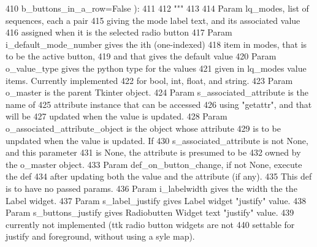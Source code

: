 \begin{DoxyCode}
410             b\_buttons\_in\_a\_row=\textcolor{keyword}{False} ):
411 
412         \textcolor{stringliteral}{"""}
413 \textcolor{stringliteral}{        }
414 \textcolor{stringliteral}{        Param lq\_modes, list of sequences, each a pair}
415 \textcolor{stringliteral}{            giving the mode label text, and its associated value}
416 \textcolor{stringliteral}{            assigned when it is the selected radio button}
417 \textcolor{stringliteral}{        Param i\_default\_mode\_number gives the ith (one-indexed)}
418 \textcolor{stringliteral}{            item in modes, that is to be the active button,}
419 \textcolor{stringliteral}{            and that gives the default value}
420 \textcolor{stringliteral}{        Param o\_value\_type gives the python type for the values}
421 \textcolor{stringliteral}{            given in lq\_modes value items.  Currently implemented}
422 \textcolor{stringliteral}{            for bool, int, float, and string.}
423 \textcolor{stringliteral}{        Param o\_master is the parent Tkinter object.}
424 \textcolor{stringliteral}{                Param s\_associated\_attribute is the name of }
425 \textcolor{stringliteral}{            attribute instance that can be accessed}
426 \textcolor{stringliteral}{            using "getattr", and that will be}
427 \textcolor{stringliteral}{            updated when the value is updated.}
428 \textcolor{stringliteral}{        Param o\_associated\_attribute\_object is the object whose attribute}
429 \textcolor{stringliteral}{            is to be unpdated when the value is updated.  If}
430 \textcolor{stringliteral}{            s\_associated\_attribute is not None, and this parameter}
431 \textcolor{stringliteral}{            is None, the attribute is presumed to be}
432 \textcolor{stringliteral}{            owned by the o\_master object.}
433 \textcolor{stringliteral}{        Param def\_on\_button\_change, if not None, execute the def}
434 \textcolor{stringliteral}{            after updating both the value and the attribute (if any).}
435 \textcolor{stringliteral}{            This def is to have no passed params.}
436 \textcolor{stringliteral}{        Param i\_labelwidth gives the width the the Label widget.}
437 \textcolor{stringliteral}{        Param s\_label\_justify gives Label widget "justify" value.}
438 \textcolor{stringliteral}{        Param s\_buttons\_justify gives Radiobutten Widget text "justify" value.}
439 \textcolor{stringliteral}{                currently not implemented (ttk radio button widgets are not}
440 \textcolor{stringliteral}{                settable for justify and foreground, without using a syle map).}

\end{DoxyCode}
